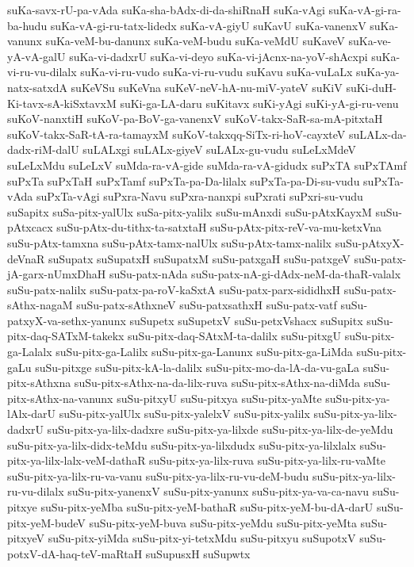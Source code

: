 {suKa-savx-rU-pa-vAda
suKa-sha-bAdx-di-da-shiRnaH
suKa-vAgi
suKa-vA-gi-ra-ba-hudu
suKa-vA-gi-ru-tatx-lidedx
suKa-vA-giyU
suKavU
suKa-vanenxV
suKa-vanunx
suKa-veM-bu-danunx
suKa-veM-budu
suKa-veMdU
suKaveV
suKa-ve-yA-vA-galU
suKa-vi-dadxrU
suKa-vi-deyo
suKa-vi-jAcnx-na-yoV-shAcxpi
suKa-vi-ru-vu-dilalx
suKa-vi-ru-vudo
suKa-vi-ru-vudu
suKavu
suKa-vuLaLx
suKa-ya-natx-satxdA
suKeVSu
suKeVna
suKeV-neV-hA-nu-miV-yateV
suKiV
suKi-duH-Ki-tavx-sA-kiSxtavxM
suKi-ga-LA-daru
suKitavx
suKi-yAgi
suKi-yA-gi-ru-venu
suKoV-nanxtiH
suKoV-pa-BoV-ga-vanenxV
suKoV-takx-SaR-sa-mA-pitxtaH
suKoV-takx-SaR-tA-ra-tamayxM
suKoV-takxqq-SiTx-ri-hoV-cayxteV
suLALx-da-dadx-riM-dalU
suLALxgi
suLALx-giyeV
suLALx-gu-vudu
suLeLxMdeV
suLeLxMdu
suLeLxV
suMda-ra-vA-gide
suMda-ra-vA-gidudx
suPxTA
suPxTAmf
suPxTa
suPxTaH
suPxTamf
suPxTa-pa-Da-lilalx
suPxTa-pa-Di-su-vudu
suPxTa-vAda
suPxTa-vAgi
suPxra-Navu
suPxra-nanxpi
suPxrati
suPxri-su-vudu
suSapitx
suSa-pitx-yalUlx
suSa-pitx-yalilx
suSu-mAnxdi
suSu-pAtxKayxM
suSu-pAtxcacx
suSu-pAtx-du-tithx-ta-satxtaH
suSu-pAtx-pitx-reV-va-mu-ketxVna
suSu-pAtx-tamxna
suSu-pAtx-tamx-nalUlx
suSu-pAtx-tamx-nalilx
suSu-pAtxyX-deVnaR
suSupatx
suSupatxH
suSupatxM
suSu-patxgaH
suSu-patxgeV
suSu-patx-jA-garx-nUmxDhaH
suSu-patx-nAda
suSu-patx-nA-gi-dAdx-neM-da-thaR-valalx
suSu-patx-nalilx
suSu-patx-pa-roV-kaSxtA
suSu-patx-parx-sididhxH
suSu-patx-sAthx-nagaM
suSu-patx-sAthxneV
suSu-patxsathxH
suSu-patx-vatf
suSu-patxyX-va-sethx-yanunx
suSupetx
suSupetxV
suSu-petxVshacx
suSupitx
suSu-pitx-daq-SATxM-takekx
suSu-pitx-daq-SAtxM-ta-dalilx
suSu-pitxgU
suSu-pitx-ga-Lalalx
suSu-pitx-ga-Lalilx
suSu-pitx-ga-Lanunx
suSu-pitx-ga-LiMda
suSu-pitx-gaLu
suSu-pitxge
suSu-pitx-kA-la-dalilx
suSu-pitx-mo-da-lA-da-vu-gaLa
suSu-pitx-sAthxna
suSu-pitx-sAthx-na-da-lilx-ruva
suSu-pitx-sAthx-na-diMda
suSu-pitx-sAthx-na-vanunx
suSu-pitxyU
suSu-pitxya
suSu-pitx-yaMte
suSu-pitx-ya-lAlx-darU
suSu-pitx-yalUlx
suSu-pitx-yalelxV
suSu-pitx-yalilx
suSu-pitx-ya-lilx-dadxrU
suSu-pitx-ya-lilx-dadxre
suSu-pitx-ya-lilxde
suSu-pitx-ya-lilx-de-yeMdu
suSu-pitx-ya-lilx-didx-teMdu
suSu-pitx-ya-lilxdudx
suSu-pitx-ya-lilxlalx
suSu-pitx-ya-lilx-lalx-veM-dathaR
suSu-pitx-ya-lilx-ruva
suSu-pitx-ya-lilx-ru-vaMte
suSu-pitx-ya-lilx-ru-va-vanu
suSu-pitx-ya-lilx-ru-vu-deM-budu
suSu-pitx-ya-lilx-ru-vu-dilalx
suSu-pitx-yanenxV
suSu-pitx-yanunx
suSu-pitx-ya-va-ca-navu
suSu-pitxye
suSu-pitx-yeMba
suSu-pitx-yeM-bathaR
suSu-pitx-yeM-bu-dA-darU
suSu-pitx-yeM-budeV
suSu-pitx-yeM-buva
suSu-pitx-yeMdu
suSu-pitx-yeMta
suSu-pitxyeV
suSu-pitx-yiMda
suSu-pitx-yi-tetxMdu
suSu-pitxyu
suSupotxV
suSu-potxV-dA-haq-teV-maRtaH
suSupusxH
suSupwtx
}

